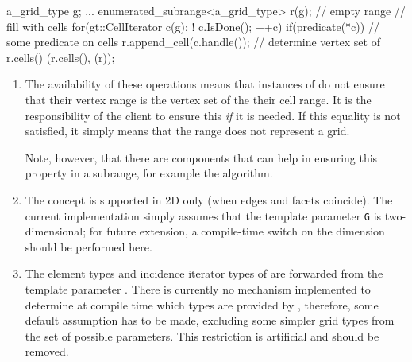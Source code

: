\begin{example}
  a\_grid\_type g;
  ...
  enumerated\_subrange<a\_grid\_type>  r(g); // empty range
  // fill with cells
  for(gt::CellIterator c(g); ! c.IsDone(); ++c)
    if(predicate(*c)) // some predicate on cells
      r.append_cell(c.handle());
  // determine vertex set of r.cells()
  (r.cells(),%
(r));
  
\end{example}
\begin{enumerate}
\item {}
  The availability of these operations means that
  instances of  
  do not ensure that their 
  vertex range is the vertex set of the 
  their cell range.
  It is the responsibility of the client to ensure this 
  {\em if\/} it is needed.
  If this equality is not satisfied, it simply means that the range
  does not represent a  grid.

  Note, however, that there are components that can help in ensuring
  this property in a subrange, for example the 
   algorithm.

\item {}
  The   concept
  is supported in 2D only (when edges and facets coincide).
  The current implementation simply assumes that the template parameter
  {\tt G} is two-dimensional; for future extension, 
  a compile-time switch on the dimension should be performed here.
\item {}
  The element types and incidence iterator types of
    are forwarded from the template
   parameter . There is currently no mechanism implemented
   to determine at compile time which types are provided by ,
   therefore, some default assumption has to be made, excluding 
   some simpler grid types from the set of possible parameters.
   This restriction is artificial and should be removed.
\end{enumerate}


 ~
 ~
